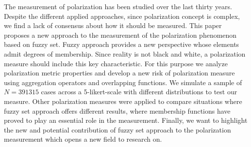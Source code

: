 
The measurement of polarization has been studied over the last thirty years. Despite the different applied approaches, since polarization concept is complex, we find a lack of consensus about how it should be measured. This paper proposes a new approach to the measurement of the polarization phenomenon based on fuzzy set. Fuzzy approach provides a new perspective whose elements admit degrees of membership. Since reality is not black and white, a polarization measure should include this key characteristic. For this purpose we analyze polarization metric properties and develop a new risk of polarization measure using aggregation operators and overlapping functions. We simulate a sample of $N = 391315$ cases across a 5-likert-scale with different distributions to test our measure. Other polarization measures were applied to compare situations where fuzzy set approach offers different results, where membership functions have proved to play an essential role in the measurement. Finally, we want to highlight the new and potential contribution of fuzzy set approach to the polarization measurement which opens a new field to research on.


